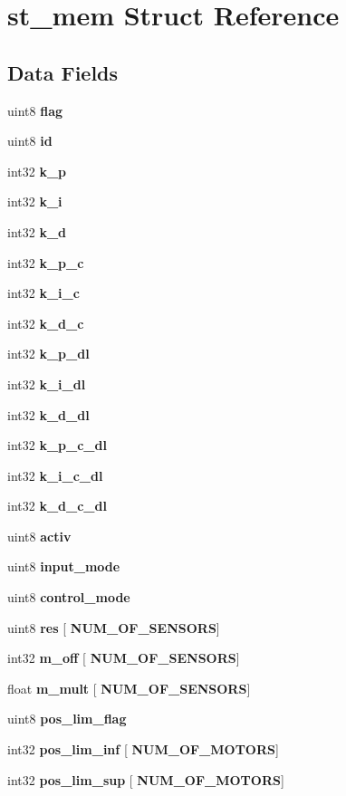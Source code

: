 \section{st\+\_\+mem Struct Reference}
\label{structst__mem}
\subsection*{Data Fields}
\begin{DoxyCompactItemize}
\item 
uint8 \textbf{ flag}
\item 
uint8 \textbf{ id}
\item 
int32 \textbf{ k\+\_\+p}
\item 
int32 \textbf{ k\+\_\+i}
\item 
int32 \textbf{ k\+\_\+d}
\item 
int32 \textbf{ k\+\_\+p\+\_\+c}
\item 
int32 \textbf{ k\+\_\+i\+\_\+c}
\item 
int32 \textbf{ k\+\_\+d\+\_\+c}
\item 
int32 \textbf{ k\+\_\+p\+\_\+dl}
\item 
int32 \textbf{ k\+\_\+i\+\_\+dl}
\item 
int32 \textbf{ k\+\_\+d\+\_\+dl}
\item 
int32 \textbf{ k\+\_\+p\+\_\+c\+\_\+dl}
\item 
int32 \textbf{ k\+\_\+i\+\_\+c\+\_\+dl}
\item 
int32 \textbf{ k\+\_\+d\+\_\+c\+\_\+dl}
\item 
uint8 \textbf{ activ}
\item 
uint8 \textbf{ input\+\_\+mode}
\item 
uint8 \textbf{ control\+\_\+mode}
\item 
uint8 \textbf{ res} [\textbf{ N\+U\+M\+\_\+\+O\+F\+\_\+\+S\+E\+N\+S\+O\+RS}]
\item 
int32 \textbf{ m\+\_\+off} [\textbf{ N\+U\+M\+\_\+\+O\+F\+\_\+\+S\+E\+N\+S\+O\+RS}]
\item 
float \textbf{ m\+\_\+mult} [\textbf{ N\+U\+M\+\_\+\+O\+F\+\_\+\+S\+E\+N\+S\+O\+RS}]
\item 
uint8 \textbf{ pos\+\_\+lim\+\_\+flag}
\item 
int32 \textbf{ pos\+\_\+lim\+\_\+inf} [\textbf{ N\+U\+M\+\_\+\+O\+F\+\_\+\+M\+O\+T\+O\+RS}]
\item 
int32 \textbf{ pos\+\_\+lim\+\_\+sup} [\textbf{ N\+U\+M\+\_\+\+O\+F\+\_\+\+M\+O\+T\+O\+RS}]
\item 

\end{DoxyCompactItemize}
